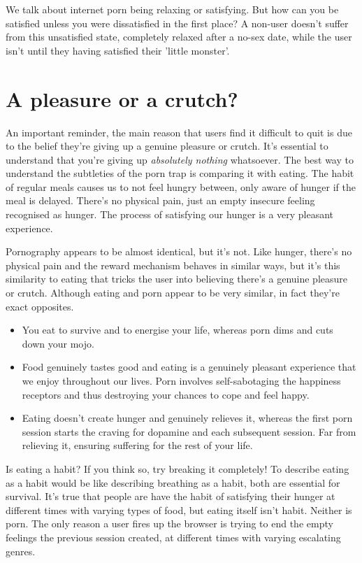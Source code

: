 \documentclass[easypeasy.tex]{subfiles}
\begin{document}
We talk about internet porn being relaxing or satisfying. But how can you be satisfied unless you were dissatisfied in the first place? A non-user doesn't suffer from this unsatisfied state, completely relaxed after a no-sex date, while the user isn't until they having satisfied their 'little monster'.

\section{A pleasure or a crutch?}
An important reminder, the main reason that users find it difficult to quit is due to the belief they're giving up a genuine pleasure or crutch. It's essential to understand that you're giving up \textit{absolutely nothing} whatsoever. The best way to understand the subtleties of the porn trap is comparing it with eating. The habit of regular meals causes us to not feel hungry between, only aware of hunger if the meal is delayed. There's no physical pain, just an empty insecure feeling recognised as hunger. The process of satisfying our hunger is a very pleasant experience.

Pornography appears to be almost identical, but it's not. Like hunger, there's no physical pain and the reward mechanism behaves in similar ways, but it's this similarity to eating that tricks the user into believing there's a genuine pleasure or crutch. Although eating and porn appear to be very similar, in fact they're exact opposites.

\begin{itemize}
  \item You eat to survive and to energise your life, whereas porn dims and cuts down your mojo.
  \item Food genuinely tastes good and eating is a genuinely pleasant experience that we enjoy throughout our lives. Porn involves self-sabotaging the happiness receptors and thus destroying your chances to cope and feel happy.
  \item Eating doesn't create hunger and genuinely relieves it, whereas the first porn session starts the craving for dopamine and each subsequent session. Far from relieving it, ensuring suffering for the rest of your life.
  \end{itemize}

Is eating a habit? If you think so, try breaking it completely! To describe eating as a habit would be like describing breathing as a habit, both are essential for survival. It's true that people are have the habit of satisfying their hunger at different times with varying types of food, but eating itself isn't habit. Neither is porn. The only reason a user fires up the browser is trying to end the empty feelings the previous session created, at different times with varying escalating genres.
\end{document}
